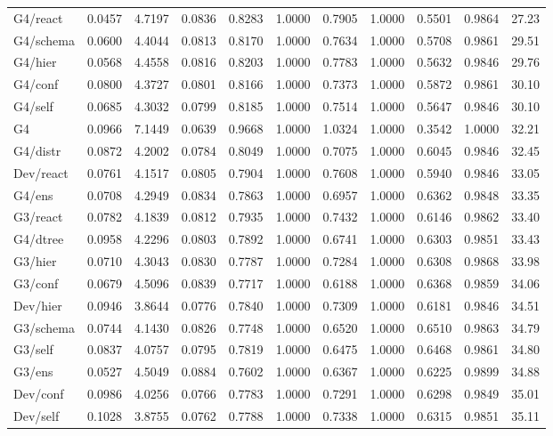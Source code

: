 \begin{table}[t]
\begin{tabular}{lrrrrrrrrrr}
\midrule
G4/react & 0.0457 & 4.7197 & 0.0836 & 0.8283 & 1.0000 & 0.7905 & 1.0000 & 0.5501 & 0.9864 & 27.23 \\
G4/schema & 0.0600 & 4.4044 & 0.0813 & 0.8170 & 1.0000 & 0.7634 & 1.0000 & 0.5708 & 0.9861 & 29.51 \\
G4/hier & 0.0568 & 4.4558 & 0.0816 & 0.8203 & 1.0000 & 0.7783 & 1.0000 & 0.5632 & 0.9846 & 29.76 \\
G4/conf & 0.0800 & 4.3727 & 0.0801 & 0.8166 & 1.0000 & 0.7373 & 1.0000 & 0.5872 & 0.9861 & 30.10 \\
G4/self & 0.0685 & 4.3032 & 0.0799 & 0.8185 & 1.0000 & 0.7514 & 1.0000 & 0.5647 & 0.9846 & 30.10 \\
G4 & 0.0966 & 7.1449 & 0.0639 & 0.9668 & 1.0000 & 1.0324 & 1.0000 & 0.3542 & 1.0000 & 32.21 \\
G4/distr & 0.0872 & 4.2002 & 0.0784 & 0.8049 & 1.0000 & 0.7075 & 1.0000 & 0.6045 & 0.9846 & 32.45 \\
Dev/react & 0.0761 & 4.1517 & 0.0805 & 0.7904 & 1.0000 & 0.7608 & 1.0000 & 0.5940 & 0.9846 & 33.05 \\
G4/ens & 0.0708 & 4.2949 & 0.0834 & 0.7863 & 1.0000 & 0.6957 & 1.0000 & 0.6362 & 0.9848 & 33.35 \\
G3/react & 0.0782 & 4.1839 & 0.0812 & 0.7935 & 1.0000 & 0.7432 & 1.0000 & 0.6146 & 0.9862 & 33.40 \\
G4/dtree & 0.0958 & 4.2296 & 0.0803 & 0.7892 & 1.0000 & 0.6741 & 1.0000 & 0.6303 & 0.9851 & 33.43 \\
G3/hier & 0.0710 & 4.3043 & 0.0830 & 0.7787 & 1.0000 & 0.7284 & 1.0000 & 0.6308 & 0.9868 & 33.98 \\
G3/conf & 0.0679 & 4.5096 & 0.0839 & 0.7717 & 1.0000 & 0.6188 & 1.0000 & 0.6368 & 0.9859 & 34.06 \\
Dev/hier & 0.0946 & 3.8644 & 0.0776 & 0.7840 & 1.0000 & 0.7309 & 1.0000 & 0.6181 & 0.9846 & 34.51 \\
G3/schema & 0.0744 & 4.1430 & 0.0826 & 0.7748 & 1.0000 & 0.6520 & 1.0000 & 0.6510 & 0.9863 & 34.79 \\
G3/self & 0.0837 & 4.0757 & 0.0795 & 0.7819 & 1.0000 & 0.6475 & 1.0000 & 0.6468 & 0.9861 & 34.80 \\
G3/ens & 0.0527 & 4.5049 & 0.0884 & 0.7602 & 1.0000 & 0.6367 & 1.0000 & 0.6225 & 0.9899 & 34.88 \\
Dev/conf & 0.0986 & 4.0256 & 0.0766 & 0.7783 & 1.0000 & 0.7291 & 1.0000 & 0.6298 & 0.9849 & 35.01 \\
Dev/self & 0.1028 & 3.8755 & 0.0762 & 0.7788 & 1.0000 & 0.7338 & 1.0000 & 0.6315 & 0.9851 & 35.11 \\

\end{tabular}
\end{table}
